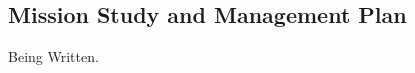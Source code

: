 
\subsection{Mission Study and Management Plan  }
\label{sec:management}

\vspace{-0.05in}

Being Written. 

